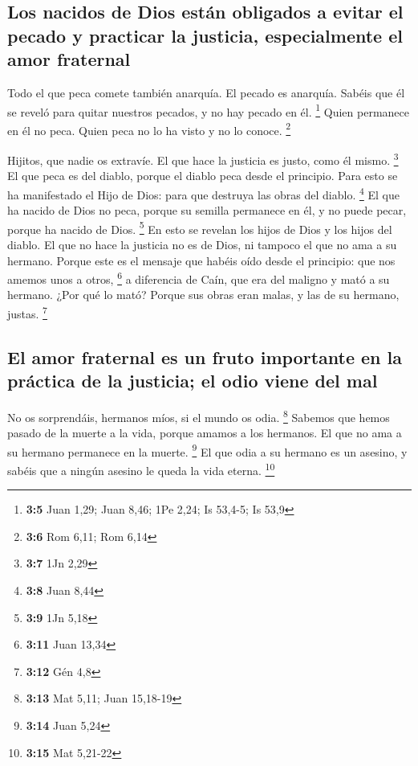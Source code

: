 \hypertarget{los-nacidos-de-dios-estuxe1n-obligados-a-evitar-el-pecado-y-practicar-la-justicia-especialmente-el-amor-fraternal}{%
\subsection{Los nacidos de Dios están obligados a evitar el pecado y
practicar la justicia, especialmente el amor
fraternal}\label{los-nacidos-de-dios-estuxe1n-obligados-a-evitar-el-pecado-y-practicar-la-justicia-especialmente-el-amor-fraternal}}

 Todo el que peca comete también anarquía. El pecado es
anarquía.  Sabéis que él se reveló para quitar nuestros
pecados, y no hay pecado en él. \footnote{\textbf{3:5} Juan 1,29; Juan
  8,46; 1Pe 2,24; Is 53,4-5; Is 53,9}  Quien permanece en
él no peca. Quien peca no lo ha visto y no lo conoce. \footnote{\textbf{3:6}
  Rom 6,11; Rom 6,14}

 Hijitos, que nadie os extravíe. El que hace la justicia
es justo, como él mismo. \footnote{\textbf{3:7} 1Jn 2,29} 
El que peca es del diablo, porque el diablo peca desde el principio.
Para esto se ha manifestado el Hijo de Dios: para que destruya las obras
del diablo. \footnote{\textbf{3:8} Juan 8,44}  El que ha
nacido de Dios no peca, porque su semilla permanece en él, y no puede
pecar, porque ha nacido de Dios. \footnote{\textbf{3:9} 1Jn 5,18}
 En esto se revelan los hijos de Dios y los hijos del
diablo. El que no hace la justicia no es de Dios, ni tampoco el que no
ama a su hermano.  Porque este es el mensaje que habéis
oído desde el principio: que nos amemos unos a otros, \footnote{\textbf{3:11}
  Juan 13,34}  a diferencia de Caín, que era del maligno
y mató a su hermano. ¿Por qué lo mató? Porque sus obras eran malas, y
las de su hermano, justas. \footnote{\textbf{3:12} Gén 4,8}

\hypertarget{el-amor-fraternal-es-un-fruto-importante-en-la-pruxe1ctica-de-la-justicia-el-odio-viene-del-mal}{%
\subsection{El amor fraternal es un fruto importante en la práctica de
la justicia; el odio viene del
mal}\label{el-amor-fraternal-es-un-fruto-importante-en-la-pruxe1ctica-de-la-justicia-el-odio-viene-del-mal}}

 No os sorprendáis, hermanos míos, si el mundo os odia.
\footnote{\textbf{3:13} Mat 5,11; Juan 15,18-19}  Sabemos
que hemos pasado de la muerte a la vida, porque amamos a los hermanos.
El que no ama a su hermano permanece en la muerte. \footnote{\textbf{3:14}
  Juan 5,24}  El que odia a su hermano es un asesino, y
sabéis que a ningún asesino le queda la vida eterna. \footnote{\textbf{3:15}
  Mat 5,21-22}


